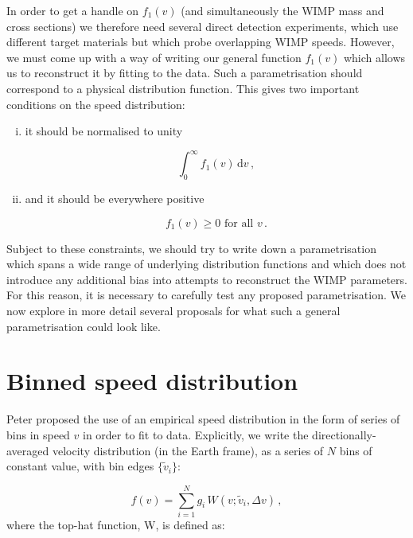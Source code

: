 In order to get a handle on $f_1(v)$ (and simultaneously the WIMP mass and cross sections) we therefore need several direct detection experiments, which use different target materials but which probe overlapping WIMP speeds. However, we must come up with a way of writing our general function $f_1(v)$ which allows us to reconstruct it by fitting to the data. Such a parametrisation should correspond to a physical distribution function. This gives two important conditions on the speed distribution:

\begin{enumerate}[(i)]

\item it should be normalised to unity

\begin{equation}
\int_0^\infty f_1(v) \, \textrm{d}v\,,
\end{equation}

\item and it should be everywhere positive

\begin{equation}
f_1(v) \geq 0 \textrm{ for all  } v\,.
\end{equation}
\end{enumerate}
Subject to these constraints, we should try to write down a parametrisation which spans a wide range of underlying distribution functions and which does not introduce any additional bias into attempts to reconstruct the WIMP parameters. For this reason, it is necessary to carefully test any proposed parametrisation. We now explore in more detail several proposals for what such a general parametrisation could look like.

\section{Binned speed distribution}
\label{sec:Speed:binned}
Peter proposed the use of an empirical speed distribution in the form of series of bins in speed $v$ in order to fit to data. Explicitly, we write the directionally-averaged velocity distribution (in the Earth frame), as a series of \(N\) bins of constant value, with bin edges \(\{ \tilde{v}_i\}\):

\begin{equation}
\label{eq:Speed:binned}
f(v) = \sum_{i = 1}^N g_i \, W(v;\tilde{v}_i,\Delta v) \,,
\end{equation}
where the top-hat function, W, is defined as:

